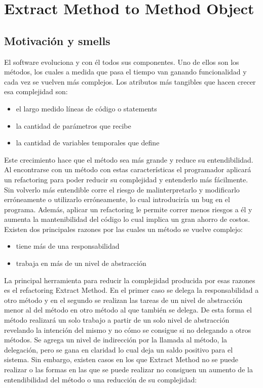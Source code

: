 \section{Extract Method to Method Object}

\subsection{Motivación y smells}
El software evoluciona y con él todos sus componentes. Uno de ellos son los métodos, los cuales a
medida que pasa el tiempo van ganando funcionalidad y cada vez se vuelven más complejos. Los
atributos más tangibles que hacen crecer esa complejidad son:

\begin{itemize}
    \item el largo medido líneas de código o statements
    \item la cantidad de parámetros que recibe
    \item la cantidad de variables temporales que define
\end{itemize}

Este crecimiento hace que el método sea más grande y reduce su entendibilidad. Al encontrarse con un
método con estas características el programador aplicará un refactoring para poder reducir su
complejidad y entenderlo más fácilmente. Sin volverlo más entendible corre el riesgo de
malinterpretarlo y modificarlo erróneamente o utilizarlo erróneamente, lo cual introduciría un bug
en el programa. Además, aplicar un refactoring le permite correr menos riesgos a él y aumenta la
mantenibilidad del código lo cual implica un gran ahorro de costos.
Existen dos principales razones por las cuales un método se vuelve complejo:

\begin{itemize}
    \item tiene más de una responsabilidad
    \item trabaja en más de un nivel de abstracción
\end{itemize}

La principal herramienta para reducir la complejidad producida por esas razones es el refactoring
Extract Method. En el primer caso se delega la responsabilidad a otro método y en el segundo se
realizan las tareas de un nivel de abstracción menor al del método en otro método al que también se
delega. De esta forma el método realizará un solo trabajo a partir de un solo nivel de abstracción
revelando la intención del mismo y no cómo se consigue si no delegando a otros métodos. Se agrega un
nivel de indirección por la llamada al método, la delegación, pero se gana en claridad lo cual deja
un saldo positivo para el sistema. Sin embargo, existen casos en los que Extract Method no se puede
realizar o las formas en las que se puede realizar no consiguen un aumento de la entendibilidad del
método o una reducción de su complejidad:


